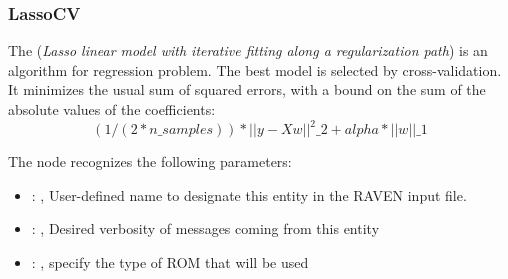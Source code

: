 \subsubsection{LassoCV}
  The  (\textit{Lasso linear model with iterative fitting along a regularization
  path})                         is an algorithm for regression problem. The best model is selected
  by cross-validation.                         It minimizes the usual sum of squared errors, with a
  bound on the sum of the                         absolute values of the coefficients:
  \begin{equation}                          (1 / (2 * n\_samples)) * ||y - Xw||^2\_2 + alpha *
  ||w||\_1                         \end{equation}

  The  node recognizes the following parameters:
    \begin{itemize}
      \item {}: ,
        User-defined name to designate this entity in the RAVEN input file.
      \item {}: ,
        Desired verbosity of messages coming from this entity
      \item {}: ,
        specify the type of ROM that will be used
  \end{itemize}

